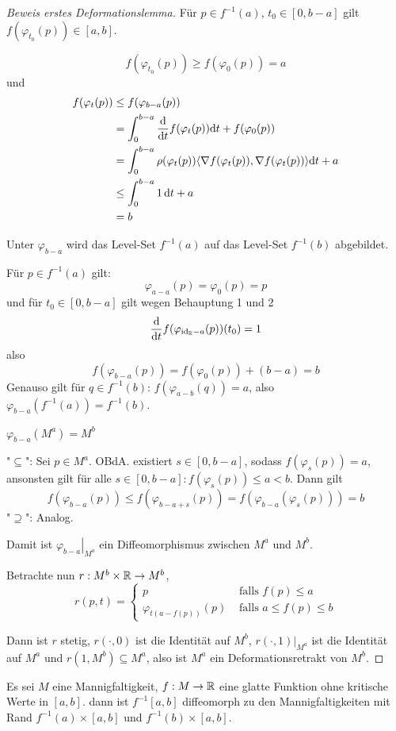 \begin{proof}[Beweis erstes Deformationslemma]
     Für $p \in f^{-1}(a)$, $t_0 \in [0, b-a]$ gilt $f(\varphi_{t_0}(p)) \in [a, b]$.
    
    \[ f(\varphi_{t_0}(p)) \geq f(\varphi_0(p)) = a \]
    und
    \begin{align*}
        f(\varphi_t(p)) 
        & \leq f(\varphi_{b-a}(p)) \\
        & = \int_0^{b-a}{ \frac{{ \operatorname{d} } }{{ \operatorname{d} } t} } f(\varphi_t(p)) { \operatorname{d} } t + f(\varphi_0(p)) \\
        & = \int_0^{b-a}\rho(\varphi_t(p)) \langle { \nabla } f (\varphi_t(p)), { \nabla } f (\varphi_t(p)) \rangle { \operatorname{d} } t + a \\
        & \leq \int_0^{b-a} 1 \, { \operatorname{d} } t + a \\
        & = b
    \end{align*}
    \sectiondone

     Unter $\varphi_{b-a}$ wird das Level-Set 
    $f^{-1}(a)$ auf das Level-Set $f^{-1}(b)$ abgebildet.
     
    Für $p \in f^{-1}(a)$ gilt:
    \[ \varphi_{a-a}(p) = \varphi_0(p) = p \]
    und für $t_0 \in [0, b - a]$ gilt wegen Behauptung 1 und 2
    \[ { \frac{{ \operatorname{d} } }{{ \operatorname{d} } t} }f(\varphi_{{ \operatorname{id} }_{{ \mathbb R }} - a}(p)) (t_0) = 1 \]
    also
    \[ f(\varphi_{b - a}(p)) = f(\varphi_{0}(p)) + (b - a) = b \]
    Genauso gilt für $q \in f^{-1}(b)$: $f(\varphi_{a - b}(q)) = a$, also 
    $\varphi_{b - a}(f^{-1}(a)) = f^{-1}(b)$.
    \sectiondone

     $\varphi_{b - a} (M^a) = M^b$

    "$\subseteq$": Sei $p \in M^a$. OBdA. existiert $s \in [0, b-a]$, sodass 
    $f(\varphi_s(p)) = a$, ansonsten gilt für alle 
    $s \in [0, b-a]: f(\varphi_s(p)) \leq a < b$. Dann gilt
    \[ f(\varphi_{b-a}(p)) \leq f(\varphi_{b-a+s}(p)) = f(\varphi_{b-a}(\varphi_s(p))) = b \] 
    "$\supseteq$": Analog.
    \sectiondone

    Damit ist $\left. \varphi_{b-a} \right\vert_{M^a}$ ein Diffeomorphismus zwischen
    $M^a$ und $M^b$. 

    Betrachte nun $r: M^b \times { \mathbb R } \to M^b$,
    \[  
        r(p, t) = \begin{cases}
            p & \text{ falls } f(p) \leq a \\
            \varphi_{t(a - f(p))}(p) & \text{ falls } a \leq f(p) \leq b 
        \end{cases}
    \]

    Dann ist $r$ stetig, $r(\cdot, 0)$ ist die Identität auf $M^b$, 
    $r(\cdot, 1)|_{M^a}$ ist die Identität auf $M^a$ und 
    $r(1, M^b) \subseteq M^a$, also ist $M^a$ ein Deformationsretrakt von $M^b$.

\end{proof}

\begin{corollary}
    Es sei $M$ eine Mannigfaltigkeit, $f: M \to { \mathbb R }$ eine glatte Funktion ohne
    kritische Werte in $[a, b]$. dann ist $f^{-1}[a, b]$ diffeomorph zu den
    Mannigfaltigkeiten mit Rand $f^{-1}(a) \times [a, b]$ und 
    $f^{-1}(b) \times [a, b]$.
\end{corollary}
